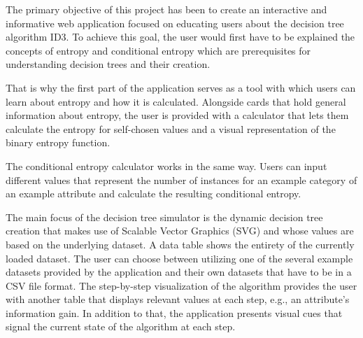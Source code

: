 
The primary objective of this project has been to create an interactive and informative web application focused on educating users about the decision tree algorithm ID3.
To achieve this goal, the user would first have to be explained the concepts of entropy and conditional entropy which are prerequisites for understanding decision trees and their creation. 

That is why the first part of the application serves as a tool with which users can learn about entropy and how it is calculated. Alongside cards that hold general information about entropy, the user is provided with a calculator that lets them calculate the entropy for self-chosen values and a visual representation of the binary entropy function.

The conditional entropy calculator works in the same way. Users can input different values that represent the number of instances for an example category of an example attribute and calculate the resulting conditional entropy.

The main focus of the decision tree simulator is the dynamic decision tree creation that makes use of Scalable Vector Graphics (SVG) and whose values are based on the underlying dataset. A data table shows the entirety of the currently loaded dataset. The user can choose between utilizing one of the several example datasets provided by the application and their own datasets that have to be in a CSV file format. The step-by-step visualization of the algorithm provides the user with another table that displays relevant values at each step, e.g., an attribute's information gain. In addition to that, the application presents visual cues that signal the current state of the algorithm at each step.